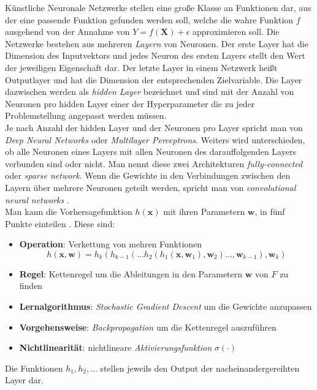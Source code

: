 K\"unstliche Neuronale Netzwerke stellen eine gro{\ss}e Klasse an Funktionen dar, aus der eine passende Funktion gefunden werden soll, welche 
die wahre Funktion $f$ ausgehend von der Annahme von $Y = f(\mathbf{X}) + \epsilon$ approximieren soll. Die Netzwerke bestehen aus mehreren \textit{Layern} von Neuronen. Der erste Layer hat 
die Dimension des Inputvektors und jedes Neuron des ersten Layers stellt den Wert der jeweiligen Eigenschaft dar. Der letzte Layer in einem Netzwerk hei{\ss}t 
Outputlayer und hat die Dimension der entsprechenden Zielvariable. Die Layer dazwischen werden als \textit{hidden Layer} bezeichnet und sind mit der Anzahl von Neuronen pro 
hidden Layer einer der Hyperparameter die zu jeder Problemstellung angepasst werden m\"ussen. \\

Je nach Anzahl der hidden Layer und der Neuronen pro Layer spricht man von \textit{Deep Neural Networks} oder \textit{Multilayer Perceptrons}. Weiters wird unterschieden, ob
alle Neuronen eines Layers mit allen Neuronen des darauffolgenden Layers verbunden sind oder nicht. Man nennt diese zwei Architekturen \textit{fully-connected} oder \textit{sparse network}. 
Wenn die Gewichte in den Verbindungen zwischen den Layern \"uber mehrere Neuronen geteilt werden, spricht man von \textit{convolutional neural networks} \cite[Kapitel 7.2]{strang}. \\

Man kann die Vorhersagefunktion $h(\mathbf{x})$ mit ihren Parametern $\mathbf{w}$, in f\"unf Punkte einteilen \cite[Kapitel 7.1]{strang}. 
Diese sind:
\begin{itemize}
  \item \textbf{Operation}: Verkettung von mehren Funktionen
   $$h(\mathbf{x}, \mathbf{w}) = h_k(h_{k-1}(\dots h_2(h_1(\mathbf{x}, \mathbf{w}_1), \mathbf{w}_2)\dots,\mathbf{w}_{k-1}),\mathbf{w}_k)$$
  \item \textbf{Regel}: Kettenregel um die Ableitungen in den Parametern $\mathbf{w}$ von $F$ zu finden
  \item \textbf{Lernalgorithmus}: \textit{Stochastic Gradient Descent} um die Gewichte anzupassen
  \item \textbf{Vorgehensweise}: \textit{Backpropagation} um die Kettenregel auszuf\"uhren
  \item \textbf{Nichtlinearit\"at}: nichtlineare \textit{Aktivierungsfunktion} $\sigma(\cdot)$
\end{itemize}

Die Funktionen $h_1, h_2, \dots$ stellen jeweils den Output der nacheinandergereihten Layer dar. \\

